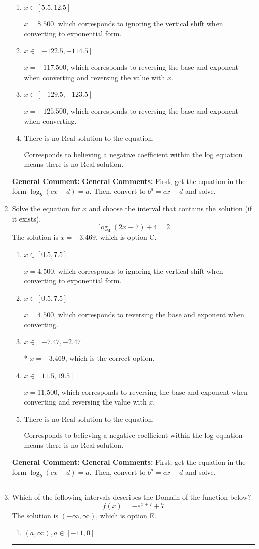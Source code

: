 \documentclass{extbook}[14pt]
\newcommand{\litem}[1]{\item #1

\rule{\textwidth}{0.4pt}}
\begin{document}
\begin{enumerate}
{\begin{enumerate}[label=\Alph*.]
* $x = -3.996$, which is the correct option.
\item \( x \in [5.5, 12.5] \)

$x = 8.500$, which corresponds to ignoring the vertical shift when converting to exponential form.
\item \( x \in [-122.5, -114.5] \)

$x = -117.500$, which corresponds to reversing the base and exponent when converting and reversing the value with $x$.
\item \( x \in [-129.5, -123.5] \)

$x = -125.500$, which corresponds to reversing the base and exponent when converting.
\item \( \text{There is no Real solution to the equation.} \)

Corresponds to believing a negative coefficient within the log equation means there is no Real solution.
\end{enumerate}

\textbf{General Comment:} \textbf{General Comments:} First, get the equation in the form $\log_b{(cx+d)} = a$. Then, convert to $b^a = cx+d$ and solve.
}
\litem{
Solve the equation for $x$ and choose the interval that contains the solution (if it exists).
\[ \log_{4}{(2x+7)}+4 = 2 \]The solution is \( x = -3.469 \), which is option C.\begin{enumerate}[label=\Alph*.]
\item \( x \in [0.5, 7.5] \)

$x = 4.500$, which corresponds to ignoring the vertical shift when converting to exponential form.
\item \( x \in [0.5, 7.5] \)

$x = 4.500$, which corresponds to reversing the base and exponent when converting.
\item \( x \in [-7.47, -2.47] \)

* $x = -3.469$, which is the correct option.
\item \( x \in [11.5, 19.5] \)

$x = 11.500$, which corresponds to reversing the base and exponent when converting and reversing the value with $x$.
\item \( \text{There is no Real solution to the equation.} \)

Corresponds to believing a negative coefficient within the log equation means there is no Real solution.
\end{enumerate}

\textbf{General Comment:} \textbf{General Comments:} First, get the equation in the form $\log_b{(cx+d)} = a$. Then, convert to $b^a = cx+d$ and solve.
}
\litem{
Which of the following intervals describes the Domain of the function below?
\[ f(x) = -e^{x+7}+7 \]The solution is \( (-\infty, \infty) \), which is option E.\begin{enumerate}[label=\Alph*.]
\item \( (a, \infty), a \in [-11, 0] \)


\end{enumerate}}
\end{enumerate}
\end{document}

